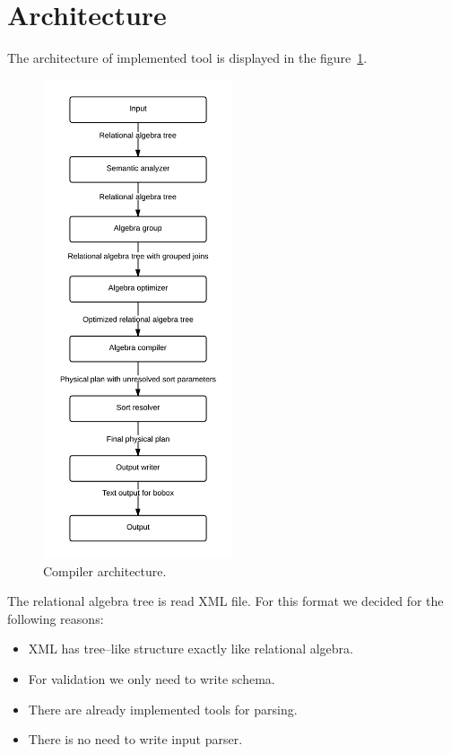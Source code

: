 \section{Architecture}
The architecture of implemented tool is displayed in the figure~\ref{fig:compilerarchitecture}.

\begin{figure}[h!]
  \centering
    \includegraphics[width=0.5\textwidth]{compilerarchitecture}

      \caption{Compiler architecture.}
          \label{fig:compilerarchitecture}
\end{figure}

The relational algebra tree is read XML file. For this format we decided for the following reasons:
\begin{itemize}
\item XML has tree--like structure exactly like relational algebra.
\item For validation we only need to write schema.
\item There are already implemented tools for parsing.
\item There is no need to write input parser.
\end{itemize}

